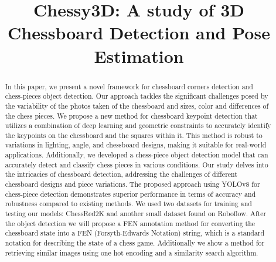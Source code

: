 \documentclass[conference]{IEEEtran}
\begin{document}
\title{Chessy3D: A study of 3D Chessboard Detection and Pose Estimation\\
}

\author{
\and
{}
\and
{}
}

\maketitle

\begin{abstract}
In this paper, we present a novel framework for chessboard corners detection
 and chess-pieces object detection. 
Our approach tackles the significant challenges posed by the variability
 of the photos taken of the chessboard and sizes, color and differences of the chess pieces.
We propose a new method for chessboard keypoint detection that utilizes a combination of
 deep learning and geometric constraints to accurately identify the keypoints on the chessboard
 and the squares within it.
This method is robust to variations in lighting, angle, and chessboard designs,
making it suitable for real-world applications.
Additionally, we developed a chess-piece object detection model that can accurately detect and classify chess pieces in various conditions.
Our study delves into the intricacies of chessboard detection, addressing the challenges of different chessboard designs and piece variations.
The proposed approach using YOLOv8 for chess-piece detection
 demonstrates superior performance in terms of accuracy and robustness compared to existing methods.
We used two datasets for training and testing our models: ChessRed2K and another small dataset found on Roboflow.
After the object detection we will propose a FEN annotation method for converting the chessboard state into a
 FEN (Forsyth-Edwards Notation) string, which is a standard notation for describing the state of a chess game.
Additionally we show a method for retrieving similar images using one hot encoding
 and a similarity search algorithm.
\end{abstract}
\end{document}
